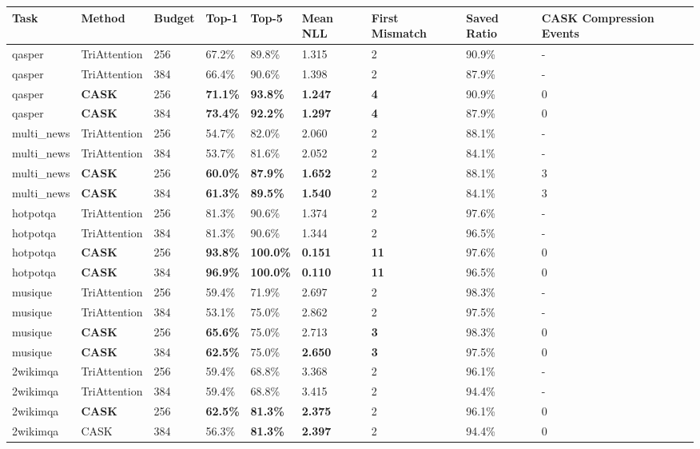 \begin{table}[H]
\centering
\small
\begin{tabularx}{\textwidth}{YYYYYYYYY}
\toprule
Task & Method & Budget & Top-1 & Top-5 & Mean NLL & First Mismatch & Saved Ratio & CASK Compression Events \\
\midrule
qasper & TriAttention & 256 & 67.2\% & 89.8\% & 1.315 & 2 & 90.9\% & - \\
qasper & TriAttention & 384 & 66.4\% & 90.6\% & 1.398 & 2 & 87.9\% & - \\
qasper & \textbf{CASK} & 256 & \textbf{71.1\%} & \textbf{93.8\%} & \textbf{1.247} & \textbf{4} & 90.9\% & 0 \\
qasper & \textbf{CASK} & 384 & \textbf{73.4\%} & \textbf{92.2\%} & \textbf{1.297} & \textbf{4} & 87.9\% & 0 \\
multi\_news & TriAttention & 256 & 54.7\% & 82.0\% & 2.060 & 2 & 88.1\% & - \\
multi\_news & TriAttention & 384 & 53.7\% & 81.6\% & 2.052 & 2 & 84.1\% & - \\
multi\_news & \textbf{CASK} & 256 & \textbf{60.0\%} & \textbf{87.9\%} & \textbf{1.652} & 2 & 88.1\% & 3 \\
multi\_news & \textbf{CASK} & 384 & \textbf{61.3\%} & \textbf{89.5\%} & \textbf{1.540} & 2 & 84.1\% & 3 \\
hotpotqa & TriAttention & 256 & 81.3\% & 90.6\% & 1.374 & 2 & 97.6\% & - \\
hotpotqa & TriAttention & 384 & 81.3\% & 90.6\% & 1.344 & 2 & 96.5\% & - \\
hotpotqa & \textbf{CASK} & 256 & \textbf{93.8\%} & \textbf{100.0\%} & \textbf{0.151} & \textbf{11} & 97.6\% & 0 \\
hotpotqa & \textbf{CASK} & 384 & \textbf{96.9\%} & \textbf{100.0\%} & \textbf{0.110} & \textbf{11} & 96.5\% & 0 \\
musique & TriAttention & 256 & 59.4\% & 71.9\% & 2.697 & 2 & 98.3\% & - \\
musique & TriAttention & 384 & 53.1\% & 75.0\% & 2.862 & 2 & 97.5\% & - \\
musique & \textbf{CASK} & 256 & \textbf{65.6\%} & 75.0\% & 2.713 & \textbf{3} & 98.3\% & 0 \\
musique & \textbf{CASK} & 384 & \textbf{62.5\%} & 75.0\% & \textbf{2.650} & \textbf{3} & 97.5\% & 0 \\
2wikimqa & TriAttention & 256 & 59.4\% & 68.8\% & 3.368 & 2 & 96.1\% & - \\
2wikimqa & TriAttention & 384 & 59.4\% & 68.8\% & 3.415 & 2 & 94.4\% & - \\
2wikimqa & \textbf{CASK} & 256 & \textbf{62.5\%} & \textbf{81.3\%} & \textbf{2.375} & 2 & 96.1\% & 0 \\
2wikimqa & CASK & 384 & 56.3\% & \textbf{81.3\%} & \textbf{2.397} & 2 & 94.4\% & 0 \\
\bottomrule
\end{tabularx}
\end{table}



